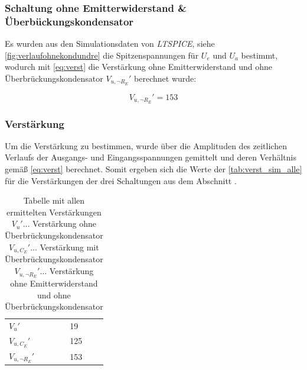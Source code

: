 \documentclass[12pt,english,ngerman]{scrartcl}
\begin{document}
\subsubsection{Schaltung ohne Emitterwiderstand \& Überbückungskondensator}

Es wurden aus den Simulationsdaten von \textit{LTSPICE}, siehe
\autoref{fig:verlaufohnekondundre} die Spitzenspannungen für $U_e$ und $U_a$
bestimmt, wodurch mit \autoref{eq:verst} die Verstärkung ohne Emitterwiderstand
und ohne Überbrückungskondensator $V_{u,\neg R_{E}}'$ berechnet wurde:

\begin{equation}
  V_{u,\neg R_{E}}' = 153
  \label{eq:sim_verst_ohne_ohne_re}
\end{equation}

\subsubsection{Verstärkung} \label{sec:ausverst}
Um die Verstärkung zu bestimmen, wurde über die Amplituden des zeitlichen
Verlaufs der Ausgangs- und Eingangsspannungen gemittelt und deren Verhältnis
gemäß \autoref{eq:verst} berechnet. Somit ergeben sich die Werte der
\autoref{tab:verst_sim_alle} für die Verstärkungen der drei Schaltungen aus dem Abschnitt
. 


\begin{table}[H]
  \caption{Tabelle mit allen ermittelten Verstärkungen \\
  $V_{u}' \dots$ Verstärkung ohne Überbrückungskondensator \\
  $V_{u,C_{E}}' \dots$   Verstärkung mit Überbrückungskondensator \\
  $V_{u,\neg R_{E}}' \dots$ Verstärkung ohne Emitterwiderstand und ohne Überbrückungskondensator 
  }
  \label{tab:verst_sim_alle}
  \centering
  \begin{tabular}{l|l}
  $V_{u}'$            & 19 \\
  $V_{u,C_{E}}'$      & 125 \\
  $V_{u,\neg R_{E}}'$ & 153
  \end{tabular}
\end{table}



\end{document}

